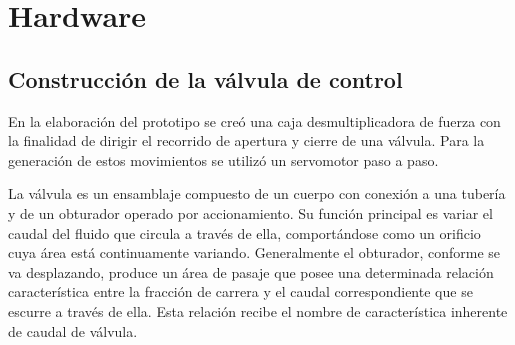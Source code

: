 \section{Hardware}
\subsection{Construcción de la válvula de control}
\label{subsec:Construcción de la válvula de control}

En la elaboración del prototipo se creó una caja desmultiplicadora de fuerza con la finalidad de dirigir el recorrido de apertura y cierre de una válvula. Para la generación de estos movimientos se utilizó un servomotor paso a paso.

La válvula es un ensamblaje compuesto de un cuerpo con conexión a una tubería y de un obturador operado por accionamiento. Su función principal es variar el caudal del fluido que circula a través de ella, comportándose como un orificio cuya área está continuamente variando. 
Generalmente el obturador, conforme se va desplazando, produce un área de pasaje que posee una determinada relación característica entre la fracción de carrera y el caudal correspondiente que se escurre a través de ella. Esta relación recibe el nombre de característica inherente de caudal de válvula.

